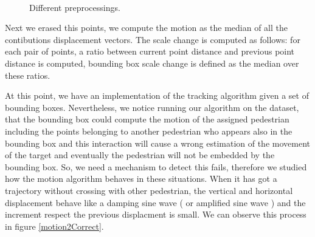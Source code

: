 \documentclass[12pt, a4paper, titlepage,twoside,openright]{article}
\begin{document}
\begin{figure}[H]
		
\centering

\\
\caption{Different preprocessings.}
\label{motion3}
\end{figure}


Next we erased this points, we compute the motion as the median of all the contibutions displacement vectors. The scale change is computed as follows: for each pair of points, a ratio between current point distance and previous point distance is computed, bounding box scale change is defined as the median over these ratios. 

At this point, we have an implementation of the tracking algorithm given a set of bounding boxes. Nevertheless, we notice running our algorithm on the dataset, that the bounding box could compute the motion of the assigned pedestrian including the points belonging to another pedestrian who appears also in the bounding box and this interaction will cause a wrong estimation of the movement of the target and eventually the pedestrian will not be embedded by the bounding box. So, we need a mechanism to detect this fails, therefore we studied how the motion algorithm behaves in these situations. When it has got a trajectory without crossing with other pedestrian, the vertical and horizontal displacement behave like a damping sine wave   ( or amplified sine wave )   and the increment respect the previous displacment is small. We can observe this process in figure \ref{motion2Correct}.
\end{document}
